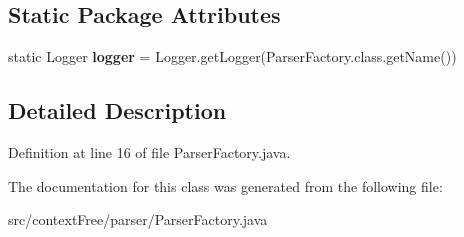 \subsection*{Static Package Attributes}
\begin{DoxyCompactItemize}
\item 
\hypertarget{classcontext_free_1_1parser_1_1_parser_factory_a9f3c0ca552f2383e6da4ccabfdd4585d}{static Logger {\bfseries logger} = Logger.\-get\-Logger(Parser\-Factory.\-class.\-get\-Name())}\label{classcontext_free_1_1parser_1_1_parser_factory_a9f3c0ca552f2383e6da4ccabfdd4585d}

\end{DoxyCompactItemize}


\subsection{Detailed Description}


Definition at line 16 of file Parser\-Factory.\-java.



The documentation for this class was generated from the following file\-:\begin{DoxyCompactItemize}
\item 
src/context\-Free/parser/Parser\-Factory.\-java\end{DoxyCompactItemize}
